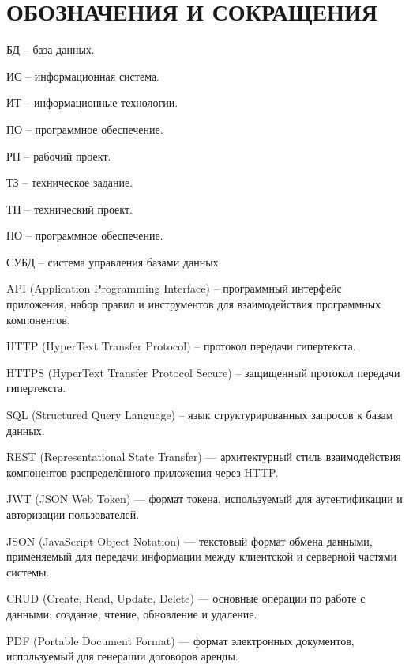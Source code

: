 \section*{ОБОЗНАЧЕНИЯ И СОКРАЩЕНИЯ}

БД – база данных.

ИС – информационная система.

ИТ – информационные технологии.

ПО – программное обеспечение.

РП – рабочий проект.

ТЗ – техническое задание.

ТП – технический проект.

ПО – программное обеспечение.

СУБД – система управления базами данных.

API (Application Programming Interface) – программный интерфейс приложения, набор правил и инструментов для взаимодействия программных компонентов.

HTTP (HyperText Transfer Protocol) – протокол передачи гипертекста.

HTTPS (HyperText Transfer Protocol Secure) – защищенный протокол передачи гипертекста.

SQL (Structured Query Language) – язык структурированных запросов к базам данных.

REST (Representational State Transfer) — архитектурный стиль взаимодействия компонентов распределённого приложения через HTTP.

JWT (JSON Web Token) — формат токена, используемый для аутентификации и авторизации пользователей.

JSON (JavaScript Object Notation) — текстовый формат обмена данными, применяемый для передачи информации между клиентской и серверной частями системы.

CRUD (Create, Read, Update, Delete) — основные операции по работе с данными: создание, чтение, обновление и удаление.

PDF (Portable Document Format) — формат электронных документов, используемый для генерации договоров аренды.
